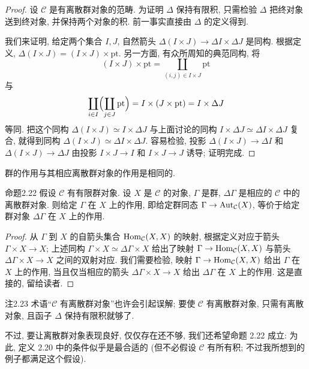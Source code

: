 \begin{proof}
设 $\mathcal C$ 是有离散群对象的范畴. 为证明 $\Delta$ 保持有限积, 只需检验 $\Delta$ 把终对象送到终对象, 并保持两个对象的积. 前一事实直接由 $\Delta$ 的定义得到.

我们来证明, 给定两个集合 $I,J$, 自然箭头 $\Delta(I\times J)\to\Delta I\times\Delta J$ 是同构. 根据定义, $\Delta(I\times J)=(I\times J)\times\mathrm{pt}$. 另一方面, 有众所周知的典范同构, 将
\[
(I\times J)\times\mathrm{pt}=\coprod_{(i,j)\in I\times J}\mathrm{pt}
\]
与
\[
\coprod_{i\in I}\Bigl(\coprod_{j\in J}\mathrm{pt}\Bigr)=I\times(J\times\mathrm{pt})=I\times\Delta J
\]
等同. 把这个同构 $\Delta(I\times J)\simeq I\times\Delta J$ 与上面讨论的同构 $I\times\Delta J\simeq\Delta I\times\Delta J$ 复合, 就得到同构 $\Delta(I\times J)\simeq\Delta I\times\Delta J$. 容易检验, 投影 $\Delta(I\times J)\to\Delta I$ 和 $\Delta(I\times J)\to\Delta J$ 由投影 $I\times J\to I$ 和 $I\times J\to J$ 诱导; 证明完成.
\end{proof}

群的作用与其相应离散群对象的作用是相同的.

\begin{origstatement}{命题}{2.22}\label{ch02:prop222}
假设 $\mathcal C$ 有有限群对象. 设 $X$ 是 $\mathcal C$ 的对象, $\Gamma$ 是群, $\Delta\Gamma$ 是相应的 $\mathcal C$ 中的离散群对象. 则给定 $\Gamma$ 在 $X$ 上的作用, 即给定群同态 $\Gamma\to\operatorname{Aut}_{\mathcal C}(X)$, 等价于给定群对象 $\Delta\Gamma$ 在 $X$ 上的作用.
\end{origstatement}
\begin{proof}
从 $\Gamma$ 到 $X$ 的自箭头集合 $\operatorname{Hom}_{\mathcal C}(X,X)$ 的映射, 根据定义对应于箭头 $\Gamma\times X\to X$; 上述同构 $\Gamma\times X\simeq\Delta\Gamma\times X$ 给出了映射 $\Gamma\to\operatorname{Hom}_{\mathcal C}(X,X)$ 与箭头 $\Delta\Gamma\times X\to X$ 之间的双射对应. 我们需要检验, 映射 $\Gamma\to\operatorname{Hom}_{\mathcal C}(X,X)$ 给出 $\Gamma$ 在 $X$ 上的作用, 当且仅当相应的箭头 $\Delta\Gamma\times X\to X$ 给出 $\Delta\Gamma$ 在 $X$ 上的作用. 这是直接的, 留给读者.
\end{proof}

\begin{origstatement}{注}{2.23}\label{ch02:rem223}
术语“$\mathcal C$ 有离散群对象”也许会引起误解; 要使 $\mathcal C$ 有离散群对象, 只需有离散对象, 且函子 $\Delta$ 保持有限积就够了.

不过, 要让离散群对象表现良好, 仅仅存在还不够, 我们还希望命题 2.22 成立: 为此, 定义 2.20 中的条件似乎是最合适的 (但不必假设 $\mathcal C$ 有所有积; 不过我所想到的例子都满足这个假设).
\end{origstatement}

